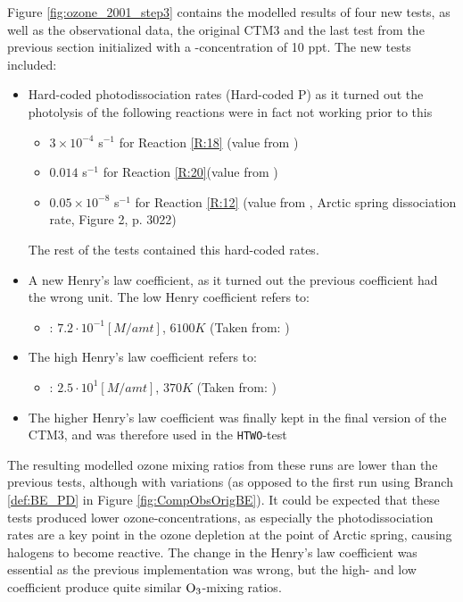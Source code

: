 Figure \ref{fig:ozone_2001_step3} contains the modelled results of four new tests, as well as the observational data, the original CTM3 and the last test from the previous section initialized with a -concentration of 10 ppt. The new tests included: 

\begin{itemize}
    \item Hard-coded photodissociation rates (Hard-coded P) as it turned out the photolysis of the following reactions were in fact not working prior to this
    \begin{itemize}
        \item $3\times10^{-4}$ s$^{-1}$ for Reaction \ref{R:18} (value from \cite{CAO})
        \item $0.014$ s$^{-1}$ for Reaction \ref{R:20}(value from \cite{CAO})
        \item $0.05\times10^{-8}$ s$^{-1}$ for Reaction \ref{R:12} (value from \cite{Papanastasiou2013}, Arctic spring dissociation rate, Figure 2, p. 3022)
    \end{itemize}
    The rest of the tests contained this hard-coded rates. 
    \item A new Henry's law coefficient, as it turned out the previous coefficient had the wrong unit. The low Henry coefficient refers to:
    \begin{itemize}
        \item {}: $7.2\cdot 10^{-1} [M/amt]$, $6100 K$ (Taken from: \cite{Chameides1992})
    \end{itemize}   
    \item The high Henry's law coefficient refers to: 
    \begin{itemize}
        \item {}: $2.5 \cdot 10^{1} [M/amt]$, $370 K$ (Taken from: \cite{dean1999})
    \end{itemize}
    \item The higher Henry's law coefficient was finally kept in the final version of the CTM3, and was therefore used in the \texttt{HTWO}-test
\end{itemize}

The resulting modelled ozone mixing ratios from these runs are lower than the previous tests, although with variations (as opposed to the first run using Branch \ref{def:BE_PD} in Figure \ref{fig:CompObsOrigBE}). It could be expected that these tests produced lower ozone-concentrations, as especially the photodissociation rates are a key point in the ozone depletion at the point of Arctic spring, causing halogens to become reactive. The change in the Henry's law coefficient was essential as the previous implementation was wrong, but the high- and low coefficient produce quite similar $\mathrm{O_3}$-mixing ratios. 

